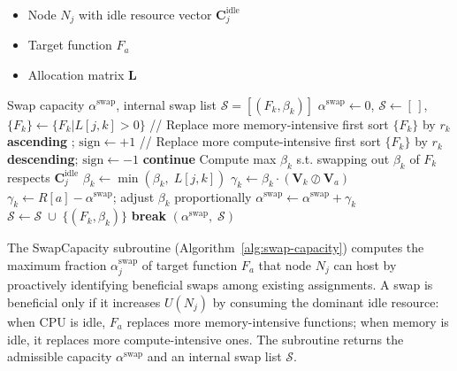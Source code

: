 \begin{algorithm}[t]
\caption{SwapCapacity: Compute beneficial swap capacity}
\label{alg:swap-capacity}
\begin{algorithmic}[1]
\Require $ $
\Statex \begin{itemize}
    \setlength{\itemindent}{.0em} %
    \item Node $N_j$ with idle resource vector $\mathbf{C}_j^{\text{idle}}$
    \item Target function $F_a$
    \item Allocation matrix $\mathbf{L}$
\end{itemize}
\Ensure Swap capacity $\alpha^{\text{swap}}$, internal swap list $\mathcal{S} = [ (F_k, \beta_k) ]$
\State $\alpha^{\text{swap}} \gets 0$, $\mathcal{S} \gets [\,]$, $\{F_k\} \gets \{F_k | L[j, k] > 0\}$
 
    \State // Replace more memory-intensive first
    \State sort $\{F_k\}$ by $r_k$ \textbf{ascending} ; $\text{sign} \gets +1$
\Else {}
    \State // Replace more compute-intensive first
    \State sort $\{F_k\}$ by $r_k$ \textbf{descending}; $\text{sign} \gets -1$
\EndIf
{}
        \State \textbf{continue} 
    \EndIf
    \State Compute max $\beta_k$ s.t. swapping out $\beta_k$ of $F_k$ respects $\mathbf{C}_j^{\text{idle}}$
    \State $\beta_k \gets \min(\beta_k,\; L[j, k])$
    \State $\gamma_k \gets \beta_k \cdot (\mathbf{V}_k \oslash \mathbf{V}_a)$ 
        \State $\gamma_k \gets R[a] - \alpha^{\text{swap}}$; adjust $\beta_k$ proportionally
    \EndIf
    \State $\alpha^{\text{swap}} \gets \alpha^{\text{swap}} + \gamma_k$
    \State $\mathcal{S} \gets \mathcal{S} \;\cup\; \{ (F_k, \beta_k) \}$
     \textbf{break} \EndIf
\EndFor
\State \Return $(\alpha^{\text{swap}},\; \mathcal{S})$
\end{algorithmic}
\end{algorithm}

The SwapCapacity subroutine (Algorithm~\ref{alg:swap-capacity}) computes the
maximum fraction $\alpha_j^{\text{swap}}$ of target function $F_a$ that node
$N_j$ can host by proactively identifying beneficial swaps among existing
assignments. A swap is beneficial only if it increases $U(N_j)$ by consuming the dominant idle
resource: when CPU is idle, $F_a$ replaces more memory-intensive functions;
when memory is idle, it replaces more compute-intensive ones. The subroutine
returns the admissible capacity $\alpha^{\text{swap}}$ and an internal swap list
$\mathcal{S}$.


